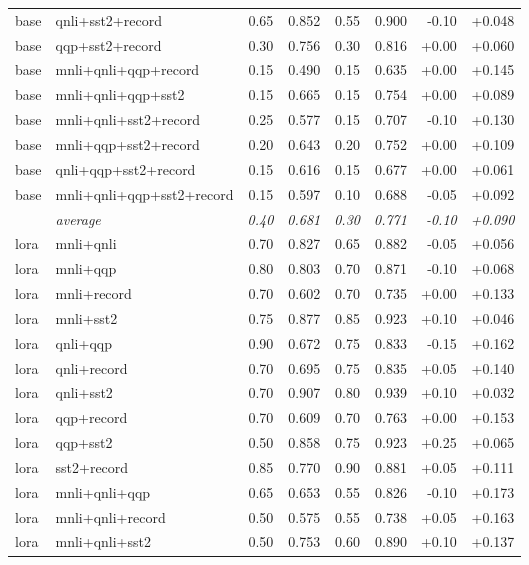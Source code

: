 \begin{table}[t]
\begin{tabular}{llrrrrrr}
    base & qnli+sst2+record & 0.65 & 0.852 & 0.55 & 0.900 & -0.10 & +0.048 \\
    base & qqp+sst2+record & 0.30 & 0.756 & 0.30 & 0.816 & +0.00 & +0.060 \\
    base & mnli+qnli+qqp+record & 0.15 & 0.490 & 0.15 & 0.635 & +0.00 & +0.145 \\
    base & mnli+qnli+qqp+sst2 & 0.15 & 0.665 & 0.15 & 0.754 & +0.00 & +0.089 \\
    base & mnli+qnli+sst2+record & 0.25 & 0.577 & 0.15 & 0.707 & -0.10 & +0.130 \\
    base & mnli+qqp+sst2+record & 0.20 & 0.643 & 0.20 & 0.752 & +0.00 & +0.109 \\
    base & qnli+qqp+sst2+record & 0.15 & 0.616 & 0.15 & 0.677 & +0.00 & +0.061 \\
    base & mnli+qnli+qqp+sst2+record & 0.15 & 0.597 & 0.10 & 0.688 & -0.05 & +0.092 \\
    \addlinespace
    & \textit{average} & \textit{0.40} & \textit{0.681} & \textit{0.30} & \textit{0.771} & \textit{-0.10} & \textit{+0.090} \\
    \midrule
    lora & mnli+qnli & 0.70 & 0.827 & 0.65 & 0.882 & -0.05 & +0.056 \\
    lora & mnli+qqp & 0.80 & 0.803 & 0.70 & 0.871 & -0.10 & +0.068 \\
    lora & mnli+record & 0.70 & 0.602 & 0.70 & 0.735 & +0.00 & +0.133 \\
    lora & mnli+sst2 & 0.75 & 0.877 & 0.85 & 0.923 & +0.10 & +0.046 \\
    lora & qnli+qqp & 0.90 & 0.672 & 0.75 & 0.833 & -0.15 & +0.162 \\
    lora & qnli+record & 0.70 & 0.695 & 0.75 & 0.835 & +0.05 & +0.140 \\
    lora & qnli+sst2 & 0.70 & 0.907 & 0.80 & 0.939 & +0.10 & +0.032 \\
    lora & qqp+record & 0.70 & 0.609 & 0.70 & 0.763 & +0.00 & +0.153 \\
    lora & qqp+sst2 & 0.50 & 0.858 & 0.75 & 0.923 & +0.25 & +0.065 \\
    lora & sst2+record & 0.85 & 0.770 & 0.90 & 0.881 & +0.05 & +0.111 \\
    lora & mnli+qnli+qqp & 0.65 & 0.653 & 0.55 & 0.826 & -0.10 & +0.173 \\
    lora & mnli+qnli+record & 0.50 & 0.575 & 0.55 & 0.738 & +0.05 & +0.163 \\
    lora & mnli+qnli+sst2 & 0.50 & 0.753 & 0.60 & 0.890 & +0.10 & +0.137 \\

\end{tabular}
\end{table}
